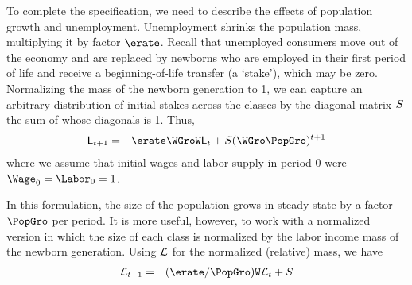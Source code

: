 \documentclass{handout}
\begin{document}
To complete the specification, we need to describe the effects of
population growth and unemployment.  Unemployment shrinks the
population mass, multiplying it by factor $\erate$.  Recall that
unemployed consumers move out of the economy and are replaced by
newborns who are employed in their first period of life and receive a
beginning-of-life transfer (a `stake'), which may be zero.
Normalizing the mass of the newborn generation to 1, we can capture an
arbitrary distribution of initial stakes across the classes by the
diagonal matrix $S$ the sum of whose diagonals is 1.  Thus,
\begin{equation}\begin{gathered}\begin{aligned}
  \LMass_{t+1} & = & \erate \WGro \Weight \LMass_{t} + \Stake (\WGro \PopGro)^{t+1}
\end{aligned}\end{gathered}\end{equation}
where we assume that initial wages and labor supply in period 0 were $\Wage_{0}=\Labor_{0}=1$.


In this formulation, the size of the population grows in steady state by a factor $\PopGro$ per
period.  It is more useful, however, to work with a normalized version in which the size of each 
class is normalized by the labor income mass of the newborn generation.  
Using $\mathcal{L}$ for the normalized (relative) mass, we have 
\begin{equation}\begin{gathered}\begin{aligned}
  \lmass_{t+1} & = & (\erate/\PopGro) \Weight \lmass_{t} + \Stake
\end{aligned}\end{gathered}\end{equation}





\end{document}
